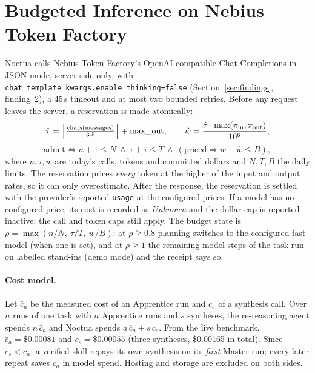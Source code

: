 \documentclass[11pt]{article}
\newcommand{\code}[1]{\texttt{#1}}
\begin{document}
\section{Budgeted Inference on Nebius Token Factory}\label{sec:budget}

Noctua calls Nebius Token Factory's OpenAI-compatible Chat Completions in JSON mode, server-side only, with
\code{chat\_template\_kwargs.enable\_thinking=false} (Section~\ref{sec:findings}, finding~2), a 45\,s timeout and at
most two bounded retries. Before any request leaves the server, a reservation is made atomically:
\begin{equation}
\hat\tau=\Bigl\lceil\tfrac{\text{chars}(\text{messages})}{3.5}\Bigr\rceil+\text{max\_out},\qquad
\hat w=\frac{\hat\tau\cdot\max(\pi_\text{in},\pi_\text{out})}{10^6},
\end{equation}
\begin{equation}
\text{admit}\iff n+1\le N\ \wedge\ \tau+\hat\tau\le T\ \wedge\ (\text{priced}\Rightarrow w+\hat w\le B),
\end{equation}
where $n,\tau,w$ are today's calls, tokens and committed dollars and $N,T,B$ the daily limits. The reservation prices
\emph{every} token at the higher of the input and output rates, so it can only overestimate. After the response,
the reservation is settled with the provider's reported \code{usage} at the configured prices. If a model has no
configured price, its cost is recorded as \emph{Unknown} and the dollar cap is reported inactive; the call and token
caps still apply. The budget state is
$\rho=\max(n/N,\ \tau/T,\ w/B)$: at $\rho\ge0.8$ planning switches to the configured fast model (when one is set), and at $\rho\ge1$
the remaining model steps of the task run on labelled stand-ins (demo mode) and the receipt says so.

\paragraph{Cost model.} Let $\bar c_a$ be the measured cost of an Apprentice run and $c_s$ of a synthesis call. Over
$n$ runs of one task with $a$ Apprentice runs and $s$ syntheses, the re-reasoning agent spends $n\,\bar c_a$ and
Noctua spends $a\,\bar c_a+s\,c_s$. From the live benchmark, $\bar c_a=\$0.00081$ and $c_s=\$0.00055$
(three syntheses, \$0.00165 in total). Since $c_s<\bar c_a$, a verified skill repays its own synthesis on its
\emph{first} Master run; every later repeat saves $\bar c_a$ in model spend. Hosting and storage are excluded on both
sides.
\end{document}
